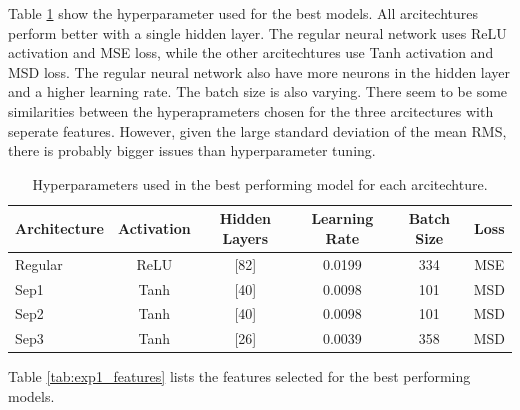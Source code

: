 Table \ref{tab:exp1_hyperparameters_best_model} show the hyperparameter used for the best models.
All arcitechtures perform better with a single hidden layer.
The regular neural network uses ReLU activation and MSE loss, while the other arcitechtures use Tanh activation and MSD loss.
The regular neural network also have more neurons in the hidden layer and a higher learning rate.
The batch size is also varying. There seem to be some similarities between the hyperaprameters chosen for the three arcitectures with seperate features.
However, given the large standard deviation of the mean RMS, there is probably bigger issues than hyperparameter tuning.\\

\begin{table}[!htbp]
    \centering
    \caption{Hyperparameters used in the best performing model for each arcitechture.}
    \begin{tabular}{lccccc}
        \toprule
        Architecture & Activation & Hidden Layers & Learning Rate & Batch Size & Loss \\
        \midrule
        Regular &  ReLU & [82] & 0.0199 & 334 & MSE \\
        Sep1    &  Tanh & [40] & 0.0098 & 101 & MSD \\
        Sep2    &  Tanh & [40] & 0.0098 & 101 & MSD \\
        Sep3    &  Tanh & [26] & 0.0039 & 358 & MSD \\
        \bottomrule
    \end{tabular}
    \label{tab:exp1_hyperparameters_best_model}
\end{table}



Table \ref{tab:exp1_features} lists the features selected for the best performing models.


